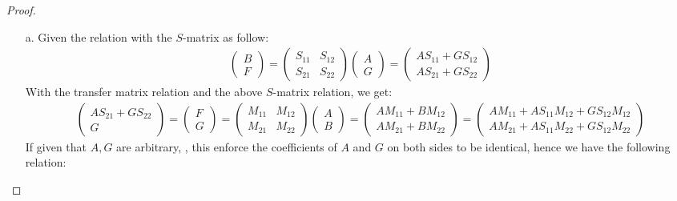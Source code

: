 \documentclass{article}
\begin{document}
\begin{proof}

    \hfil

    \begin{itemize}
        \item[a.] Given the relation with the $S$-matrix as follow:
    \begin{align}
        \begin{pmatrix}
            B\\F
        \end{pmatrix}=\begin{pmatrix}
            S_{11}&S_{12}\\S_{21}&S_{22}
        \end{pmatrix}\begin{pmatrix}
            A\\G
        \end{pmatrix}= \begin{pmatrix}
            AS_{11}+GS_{12}\\AS_{21}+GS_{22}
        \end{pmatrix}
    \end{align}
    With the transfer matrix relation and the above $S$-matrix relation, we get:
    \begin{align}
        \begin{pmatrix}
            AS_{21}+GS_{22}\\G
        \end{pmatrix}=\begin{pmatrix}
            F\\G
        \end{pmatrix}=\begin{pmatrix}
            M_{11}&M_{12}\\M_{21}&M_{22}
        \end{pmatrix}\begin{pmatrix}
            A\\B
        \end{pmatrix}=\begin{pmatrix}
            AM_{11}+BM_{12}\\AM_{21}+BM_{22}
        \end{pmatrix} = \begin{pmatrix}
            AM_{11}+AS_{11}M_{12}+GS_{12}M_{12}\\AM_{21}+AS_{11}M_{22}+GS_{12}M_{22}
        \end{pmatrix}
    \end{align}
    If given that $A,G$ are arbitrary, , this enforce the coefficients of $A$ and $G$ on both sides to be identical, hence we have the following relation:

\end{itemize}
\end{proof}
\end{document}
